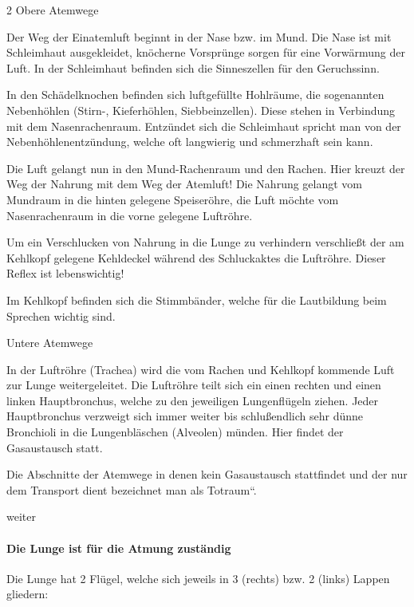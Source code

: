 \documentclass{article}
\begin{document}
\begin{multicols}{2}
Obere Atemwege

Der Weg der Einatemluft beginnt in der Nase bzw. im Mund. Die Nase ist
mit Schleimhaut ausgekleidet, kn\"ocherne Vorspr\"unge sorgen f\"ur
eine Vorw\"armung der Luft. In der Schleimhaut be\-finden sich die
Sinneszellen f\"ur den Geruchssinn. 

In den Sch\"adelknochen befinden sich luft\-ge\-f\"ullte Hohlr\"aume,
die so\-genannten Neben\-h\"ohlen (Stirn-, Kiefer\-h\"ohlen,
Siebbeinzellen). Diese stehen in Verbindung mit dem Nasenrachenraum.
Entz\"undet sich die Schleimhaut spricht man von der
Neben\-h\"ohlen\-ent\-z\"undung, welche oft langwierig und schmerzhaft
sein kann. 

Die Luft gelangt nun in den Mund-Rachen\-raum und den Rachen. Hier
kreuzt der Weg der Nahrung mit dem Weg der Atemluft! Die Nahrung
gelangt vom Mundraum in die hinten gelegene Speiser\"ohre, die Luft
m\"ochte vom Nasen\-rachen\-raum in die vorne gelegene Luftr\"ohre. 

Um ein Verschlucken von Nahrung in die Lunge zu verhindern
verschlie{\ss}t der am Kehlkopf gelegene Kehldeckel w\"ahrend des
Schluckaktes die Luftr\"ohre. Dieser Reflex ist lebenswichtig! 

Im Kehlkopf  befinden sich die Stimmb\"ander, welche f\"ur die
Lautbildung beim Sprechen wichtig sind.

Untere Atemwege

In der Luftr\"ohre (Trachea) wird die vom Rachen und Kehlkopf kommende
Luft zur Lunge weitergeleitet. Die Luftr\"ohre teilt sich ein einen
rechten und einen linken Hauptbronchus, welche zu den jeweiligen
Lungenfl\"ugeln ziehen. Jeder Hauptbronchus verzweigt sich immer weiter
bis schlu{\ss}endlich sehr d\"unne Bronchioli in die Lungenbl\"aschen
(Alveolen) m\"unden. Hier findet der Gasaustausch statt. 

Die Abschnitte der Atemwege in denen kein Gasaustausch stattfindet und
der nur dem Transport dient bezeichnet man als
{\quotedblbase}Totraum{\textquotedblleft}.

\end{multicols}
weiter

\paragraph[Die Lunge ist f\"ur die Atmung zust\"andig]{Die Lunge ist
f\"ur die Atmung zust\"andig}
Die Lunge hat 2 Fl\"ugel, welche sich jeweils in 3 (rechts) bzw. 2
(links) Lappen gliedern: 
\end{document}
